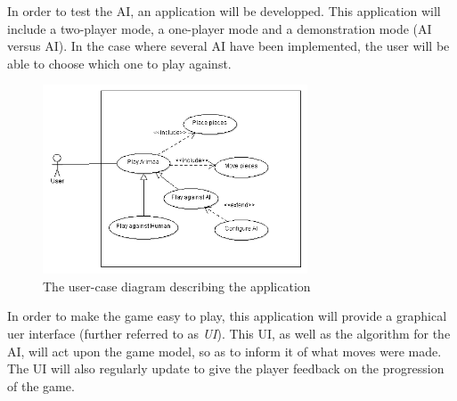 In order to test the AI, an application will be developped.
This application will include a two-player mode, a one-player mode and a demonstration mode (AI versus AI).
In the case where several AI have been implemented, the user will be able to choose which one to play against.

\begin{figure}[!h]
\centering
\includegraphics[width=0.7\textwidth]{2General_Architecture/2.1Behaviour_of_the_Game/Pictures/Application_UCD}
\caption{The user-case diagram describing the application}
\label{fig:pieces}
\end{figure}

In order to make the game easy to play, this application will provide a graphical uer interface (further referred to as \emph{UI}). %
This UI, as well as the algorithm for the AI, will act upon the game model, so as to inform it of what moves were made.
The UI will also regularly update to give the player feedback on the progression of the game.